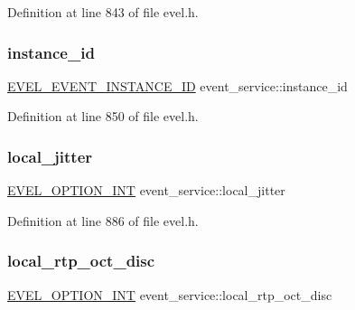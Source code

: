 Definition at line 843 of file evel.\+h.

\hypertarget{structevent__service_a8c492b6b28615086932fac3986241dd9}{}\label{structevent__service_a8c492b6b28615086932fac3986241dd9} 
\subsubsection{\texorpdfstring{instance\+\_\+id}{instance\_id}}
{\footnotesize\ttfamily \hyperlink{evel_8h_a4569c7e4bcb933caf47237a323d7c872}{E\+V\+E\+L\+\_\+\+E\+V\+E\+N\+T\+\_\+\+I\+N\+S\+T\+A\+N\+C\+E\+\_\+\+ID} event\+\_\+service\+::instance\+\_\+id}



Definition at line 850 of file evel.\+h.

\hypertarget{structevent__service_aa7a1acf4370f01b30c66772db7ac7d89}{}\label{structevent__service_aa7a1acf4370f01b30c66772db7ac7d89} 
\subsubsection{\texorpdfstring{local\+\_\+jitter}{local\_jitter}}
{\footnotesize\ttfamily \hyperlink{evel_8h_a452d825778d1c2368a54b8f689a25ba7}{E\+V\+E\+L\+\_\+\+O\+P\+T\+I\+O\+N\+\_\+\+I\+NT} event\+\_\+service\+::local\+\_\+jitter}



Definition at line 886 of file evel.\+h.

\hypertarget{structevent__service_aad4071bdb0de9e17f13ea6745f5093e4}{}\label{structevent__service_aad4071bdb0de9e17f13ea6745f5093e4} 
\subsubsection{\texorpdfstring{local\+\_\+rtp\+\_\+oct\+\_\+disc}{local\_rtp\_oct\_disc}}
{\footnotesize\ttfamily \hyperlink{evel_8h_a452d825778d1c2368a54b8f689a25ba7}{E\+V\+E\+L\+\_\+\+O\+P\+T\+I\+O\+N\+\_\+\+I\+NT} event\+\_\+service\+::local\+\_\+rtp\+\_\+oct\+\_\+disc}



